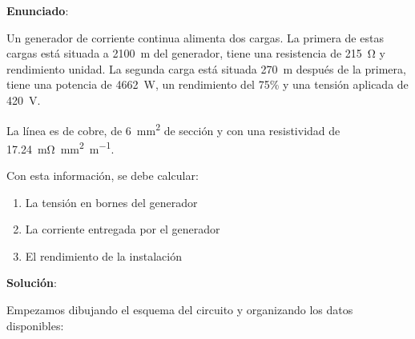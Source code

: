 \documentclass[10pt]{article}
\begin{document}
\large{\textbf{Enunciado}}:

\vspace{3mm}
Un generador de corriente continua alimenta dos cargas. La primera de estas cargas está situada a \qty{2100}{\meter} del generador, tiene una resistencia de \qty{215}{\ohm} y rendimiento unidad. La segunda carga está situada \qty{270}{\meter} después de la primera, tiene una potencia de \qty{4662}{\watt}, un rendimiento del 75\% y una tensión aplicada de \qty{420}{\volt}.

La línea es de cobre, de \qty{6}{\milli\meter\squared} de sección y con una resistividad de \qty{17.24}{\milli\ohm\milli\meter\squared\per\meter}.

\vspace{4mm}

Con esta información, se debe calcular:

\vspace{1mm}

\begin{enumerate}
    \item La tensión en bornes del generador
    \item La corriente entregada por el generador
    \item El rendimiento de la instalación
\end{enumerate}


\hrulefill

\vspace{5mm}
\textbf{Solución}:
\vspace{4mm}

Empezamos dibujando el esquema del circuito y organizando los datos disponibles:
\vspace{6mm}
\end{document}
